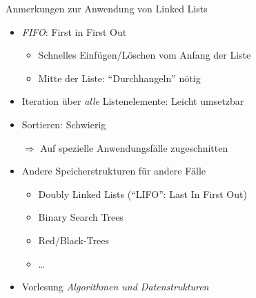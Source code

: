\begin{frame}{Anmerkungen zur Anwendung von Linked Lists}
%
\begin{itemize}
\item \emph{FIFO}: First in First Out
	\begin{itemize}
	\item Schnelles Einfügen/Löschen vom Anfang der Liste
	\item Mitte der Liste: \enquote{Durchhangeln} nötig
	\end{itemize}
\item Iteration über \emph{alle} Listenelemente: Leicht umsetzbar
\item Sortieren: Schwierig
\item[$\Rightarrow$] Auf spezielle Anwendungsfälle zugeschnitten
\item Andere Speicherstrukturen für andere Fälle
	\begin{itemize}
	\item Doubly Linked Lists (\enquote{LIFO}: Last In First Out)
	\item Binary Search Trees
	\item Red/Black-Trees
	\item \ldots
	\end{itemize}
\item Vorlesung \emph{Algorithmen und Datenstrukturen}
\end{itemize}
%
\end{frame}